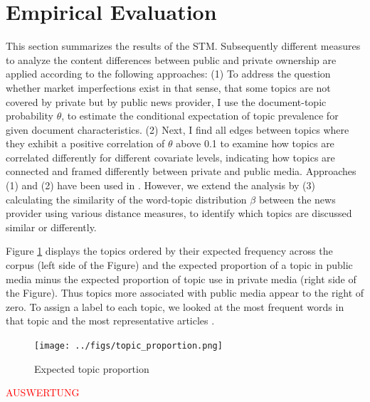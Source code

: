 \documentclass[12pt,a4paper,notitlepage]{article}
\begin{document}
\section{Empirical Evaluation}\label{ch_empirical}

This section summarizes the results of the STM. Subsequently different measures to analyze the content differences between public and private ownership are applied according to the following approaches: (1) To address the question whether market imperfections exist in that sense, that some topics are not covered by private but by public news provider, I use the document-topic probability $\theta$, to estimate the conditional expectation of topic prevalence for given document characteristics. (2) Next, I find all edges between topics where they exhibit a positive correlation of $\theta$ above 0.1 to examine how topics are correlated differently for different covariate levels, indicating how topics are connected and framed differently between private and public media. Approaches (1) and (2) have been used in \citep{roberts_model_2016}. However, we extend the analysis by (3) calculating the similarity of the word-topic distribution $\beta$ between the news provider using various distance measures, to identify which topics are discussed similar or differently. 

Figure \ref{fig_topic_proportion} displays the topics ordered by their expected frequency across the corpus (left side of the Figure) and the expected proportion of a topic in public media minus the expected proportion of topic use in private media (right side of the Figure). Thus topics more associated with public media appear to the right of zero. To assign a label to each topic, we looked at the most frequent words in that topic and the most representative articles \citep{roberts_model_2016}. 

\begin{figure}[H]
	\begin{center}
	\caption{Expected topic proportion}
		\texttt{[image: ../figs/topic\_proportion.png]}
		\label{fig_topic_proportion}
\end{center}
\end{figure}

\textcolor{red}{AUSWERTUNG}
\end{document}
